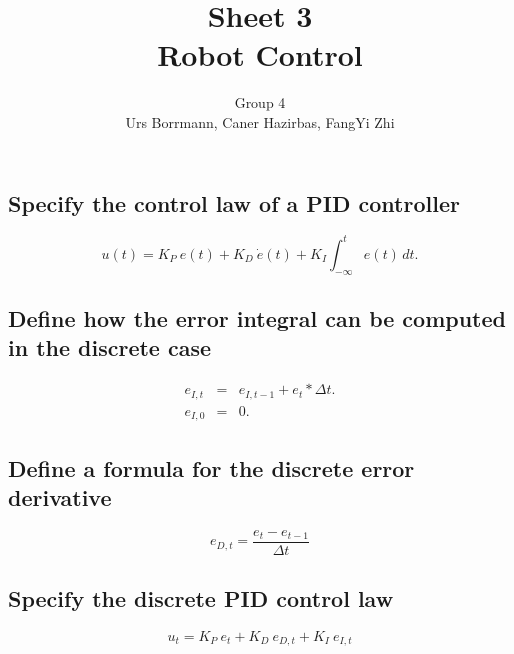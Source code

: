 \documentclass[14pt,a4paper]{article}
\title{\textbf{Sheet 3} \\  \textbf{Robot Control}}
\author{Group 4 \\Urs Borrmann, Caner Hazirbas, FangYi Zhi}
\begin{document}
\maketitle
\onehalfspacing

\section{}
	\subsection{Specify the control law of a PID controller}
	$$
		u(t)=K_P \  e(t) + K_D \ \dot{e}(t) + K_I \int_{-\infty}^t e(t)\,dt.
	$$
	
	\subsection{Define how the error integral can be computed in the discrete case}
	\begin{eqnarray*}
		e_{I,t}&=&e_{I,t-1}+e_{t}*\Delta t. \\
		e_{I,0}&=&0.
	\end{eqnarray*}
	
	\subsection{Define a formula for the discrete error derivative}
	$$
		e_{D,t}=\frac{ e_t - e_{t-1}}{\Delta t}
	$$
	
	\subsection{Specify the discrete PID control law}
	$$
		u_t=K_P \ e_t + K_D \ e_{D,t}+K_I \ e_{I,t}
	$$
	
\end{document}
